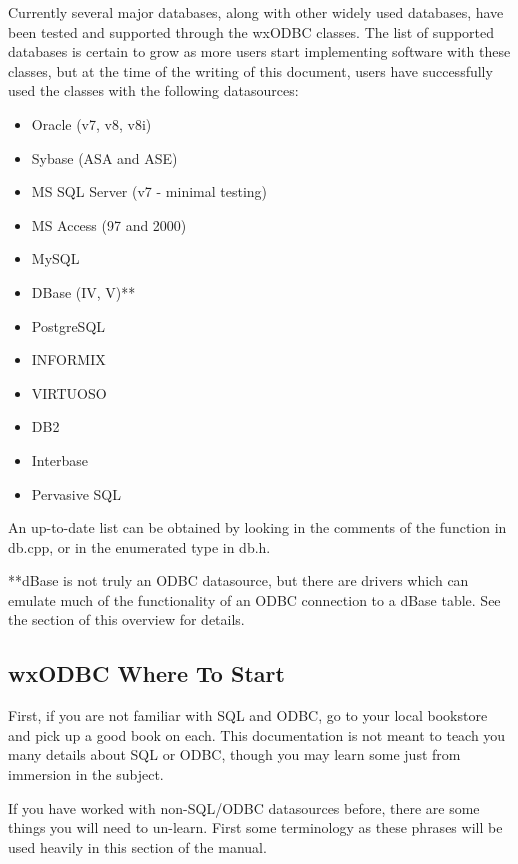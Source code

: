 Currently several major databases, along with other widely used databases, 
have been tested and supported through the wxODBC classes. The list of 
supported databases is certain to grow as more users start implementing 
software with these classes, but at the time of the writing of this document, 
users have successfully used the classes with the following datasources:

\begin{itemize}\itemsep=0pt
\item Oracle (v7, v8, v8i)
\item Sybase (ASA and ASE)
\item MS SQL Server (v7 - minimal testing)
\item MS Access (97 and 2000)
\item MySQL
\item DBase (IV, V)**
\item PostgreSQL
\item INFORMIX
\item VIRTUOSO
\item DB2
\item Interbase
\item Pervasive SQL
\end{itemize}

An up-to-date list can be obtained by looking in the comments of the function 
 in db.cpp, or in the enumerated type 
 in db.h.

**dBase is not truly an ODBC datasource, but there are drivers which can 
emulate much of the functionality of an ODBC connection to a dBase table. 
See the  section of this 
overview for details.


\subsection{wxODBC Where To Start}\label{wxodbcwheretostart}

First, if you are not familiar with SQL and ODBC, go to your local bookstore 
and pick up a good book on each. This documentation is not meant to teach 
you many details about SQL or ODBC, though you may learn some just from 
immersion in the subject.

If you have worked with non-SQL/ODBC datasources before, there are some 
things you will need to un-learn. First some terminology as these phrases will 
be used heavily in this section of the manual.

